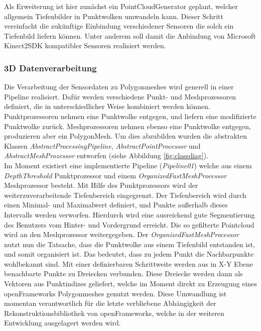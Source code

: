 Als Erweiterung ist hier zunächst ein PointCloudGenerator geplant, welcher allgemein Tiefenbilder in Punktwolken umwandeln kann. Dieser Schritt vereinfacht die zukünftige Einbindung verschiedener Sensoren die solch ein Tiefenbild liefern können. Unter anderem soll damit die Anbindung von Microsoft Kinect2SDK kompatibler Sensoren realisiert werden.

\subsubsection{3D Datenverarbeitung}
Die Verarbeitung der Sensordaten zu Polygonmeshes wird generell in einer Pipeline realisiert. Dafür werden verschiedene Punkt- und Meshprozessoren definiert, die in unterschiedlicher Weise kombiniert werden können. Punktprozessoren nehmen eine Punktwolke entgegen, und liefern eine modifizierte Punktwolke zurück. Meshprozessoren nehmen ebenso eine Punktwolke entgegen, produzieren aber ein PolygonMesh. Um dies abzubilden wurden die abstrakten Klassen \textit{AbstractProcessingPipeline}, \textit{AbstractPointProcessor} und \textit{AbstractMeshProzessor} entworfen (siehe Abbildung \ref{fig:classdiag}).\\

Im Moment existiert eine implementierte Pipeline (\textit{Pipeline01}) welche aus einem \textit{DepthThreshold} Punktprozessor und einem \textit{OrganizedFastMeshProcessor} Meshprozessor besteht. Mit Hilfe des Punktprozessors wird der weiterzuverarbeitende Tiefenbereich eingegrenzt. Der Tiefenbereich wird durch einen Minimal- und Maximalwert definiert, und Punkte außerhalb dieses Intervalls werden verworfen. Hierdurch wird eine ausreichend gute Segmentierung des Benutzers vom Hinter- und Vordergrund erreicht. Die so gefilterte Pointcloud wird an den Meshprozessor weitergegeben. Der \textit{OrganizedFastMeshProcessor} nutzt nun die Tatsache, dass die Punktwolke aus einem Tiefenbild entstanden ist, und somit organisiert ist. Das bedeutet, dass zu jedem Punkt die Nachbarpunkte wohlbekannt sind. Mit einer definierbaren Schrittweite werden aus in X-Y Ebene benachbarte Punkte zu Dreiecken verbunden. Diese Dreiecke werden dann als Vektoren aus Punktindizes geliefert, welche im Moment direkt zu Erzeugung eines openFrameworks Polygonmeshes genutzt werden. Diese Umwandlung ist momentan verantwortlich für die letzte verbliebene Abhängigkeit der Rekonstruktionsbibliothek von openFrameworks, welche in der weiteren Entwicklung ausgelagert werden wird.\\

